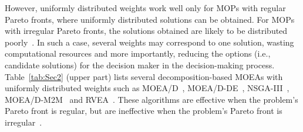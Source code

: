 


However, uniformly distributed weights work well only for MOPs with regular Pareto fronts, where uniformly distributed solutions can be obtained. For MOPs with irregular Pareto fronts, the solutions obtained are likely to be distributed poorly~\cite{Ishibuchi2016, Ma2020, Hua2021,elarbi2019}. In such a case, several weights may correspond to one solution, wasting computational resources and more importantly, reducing the options (i.e., candidate solutions) for the decision maker in the decision-making process. 
Table~\ref{tab:Sec2} (upper part) lists several decomposition-based MOEAs with uniformly distributed
weights such as MOEA/D~\cite{Zhang2007}, MOEA/D-DE~\cite{Li2009a}, NSGA-III~\cite{Deb2014}, MOEA/D-M2M~\cite{Liu2013} and RVEA~\cite{Cheng2016}. These algorithms are effective when the problem's Pareto front is regular, but are ineffective when the problem's Pareto front is irregular~\cite{Deb2014, Cheng2016, Li2019, Liu2020, Qi2014, Li2020}.

